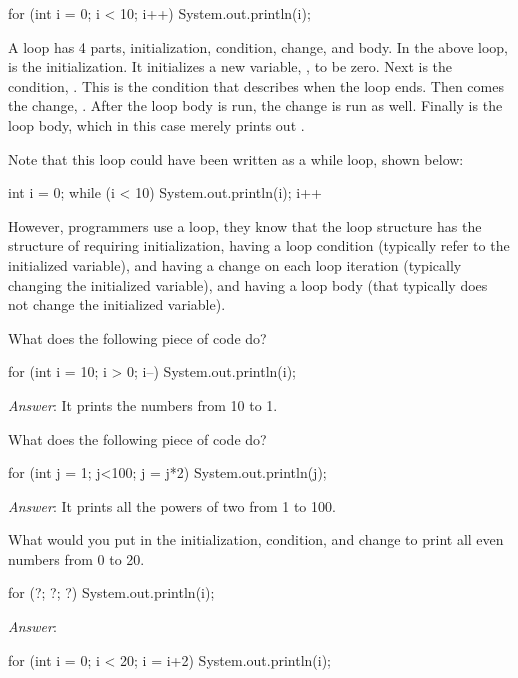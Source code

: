 \begin{code}
for (int i = 0; i < 10; i++)
{
    System.out.println(i);
}
\end{code}

A  loop has 4 parts, initialization, condition, change, and body. In the
above  loop,  is the initialization. It initializes a new
variable, , to be zero. Next is the condition, . This is the
condition that describes when the loop ends. Then comes the change, .
After the loop body is run, the change is run as well.  Finally is the loop
body, which in this case merely prints out .

Note that this loop could have been written as a while loop, shown below:
\begin{code}
int i = 0;
while (i < 10)  
{
    System.out.println(i);
    i++
}
\end{code}
%
However, programmers use a  loop, they know that the loop structure has
the structure of requiring initialization, having a loop condition (typically
refer to the initialized variable), and having a change on each loop
iteration (typically changing the initialized variable), and having a loop body
(that typically does not change the initialized variable).

\begin{example}
What does the following piece of code do?

\begin{code}
for (int i = 10; i > 0; i--)
{
    System.out.println(i);
}
\end{code}

\emph{Answer}: It prints the numbers from 10 to 1.
\end{example}

\begin{example}
What does the following piece of code do?

\begin{code}
for (int j = 1; j<100; j = j*2)
{
    System.out.println(j);
}
\end{code}

\emph{Answer}: It prints all the powers of two from 1 to 100.
\end{example}

\begin{example}
What would you put in the initialization, condition, and change to print all
even numbers from 0 to 20.

\begin{code}
for (?; ?; ?)
{
    System.out.println(i);
}
\end{code}

\emph{Answer}:
\begin{code}
for (int i = 0; i < 20; i = i+2)
{
    System.out.println(i);
}
\end{code}
\end{example}

